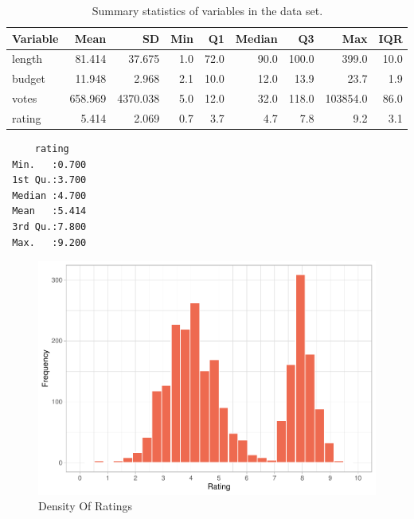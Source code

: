 \documentclass[
]{article}
\begin{document}
\begin{table}[!h]

\caption{\label{tab:summary}\label{tab:summary}Summary statistics of variables in the data set.}
\centering
\fontsize{10}{12}\selectfont
\begin{tabular}[t]{lrrrrrrrr}
\toprule
Variable & Mean & SD & Min & Q1 & Median & Q3 & Max & IQR\\
\midrule
length & 81.414 & 37.675 & 1.0 & 72.0 & 90.0 & 100.0 & 399.0 & 10.0\\
budget & 11.948 & 2.968 & 2.1 & 10.0 & 12.0 & 13.9 & 23.7 & 1.9\\
votes & 658.969 & 4370.038 & 5.0 & 12.0 & 32.0 & 118.0 & 103854.0 & 86.0\\
rating & 5.414 & 2.069 & 0.7 & 3.7 & 4.7 & 7.8 & 9.2 & 3.1\\
\bottomrule
\end{tabular}
\end{table}

\begin{verbatim}
     rating     
 Min.   :0.700  
 1st Qu.:3.700  
 Median :4.700  
 Mean   :5.414  
 3rd Qu.:7.800  
 Max.   :9.200  
\end{verbatim}

\begin{figure}[H]

{\centering \includegraphics[width=0.68\linewidth]{Group_07_Analysis_files/figure-latex/ratings -1} 

}

\caption{\label{fig:ratings} Density Of Ratings}\label{fig:ratings }
\end{figure}
\end{document}

